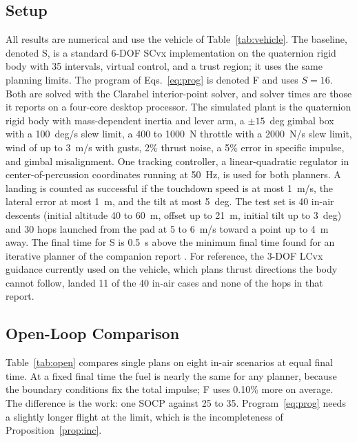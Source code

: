\documentclass[10pt,letterpaper]{article}
\theoremstyle{aiaa}
\begin{document}
\subsection{Setup}
All results are numerical and use the vehicle of Table~\ref{tab:vehicle}. The baseline, denoted S, is a standard 6-DOF SCvx
implementation \cite{mao2016,szmuk2018} on the quaternion rigid body with 35 intervals, virtual control, and a trust region; it
uses the same planning limits. The program of Eqs.~\eqref{eq:prog} is denoted F and uses $S=16$. Both are solved with the
Clarabel interior-point solver, and solver times are those it reports on a four-core desktop processor. The simulated plant is
the quaternion rigid body with mass-dependent inertia and lever arm, a $\pm15$~deg gimbal box with a 100~deg/s slew limit, a
400 to 1000~N throttle with a 2000~N/s slew limit, wind of up to 3~m/s with gusts, 2\% thrust noise, a 5\% error in specific
impulse, and gimbal misalignment. One tracking controller, a linear-quadratic regulator in center-of-percussion coordinates
running at 50~Hz, is used for both planners. A landing is counted as successful if the touchdown speed is at most 1~m/s, the
lateral error at most 1~m, and the tilt at most 5~deg. The test set is 40 in-air descents (initial altitude 40 to 60~m, offset
up to 21~m, initial tilt up to 3~deg) and 30 hops launched from the pad at 5 to 6~m/s toward a point up to 4~m away. The final
time for S is 0.5~s above the minimum final time found for an iterative planner of the companion report \cite{report}. For
reference, the 3-DOF LCvx guidance currently used on the vehicle, which plans thrust directions the body cannot follow, landed
11 of the 40 in-air cases and none of the hops in that report.

\subsection{Open-Loop Comparison}
Table~\ref{tab:open} compares single plans on eight in-air scenarios at equal final time. At a fixed final time the fuel is
nearly the same for any planner, because the boundary conditions fix the total impulse; F uses 0.10\% more on average. The
difference is the work: one SOCP against 25 to 35. Program~\eqref{eq:prog} needs a slightly longer flight at the limit, which
is the incompleteness of Proposition~\ref{prop:inc}.
\end{document}
